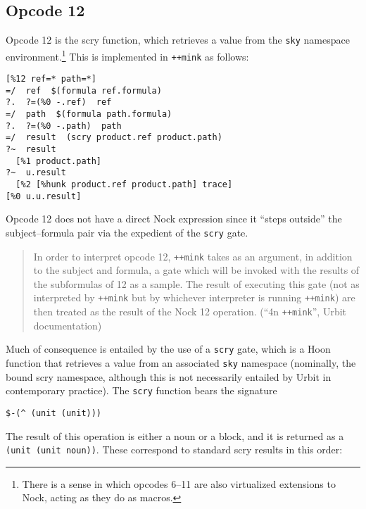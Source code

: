 \documentclass[twoside]{article}
\begin{document}
\subsection{Opcode 12}

Opcode 12 is the scry function, which retrieves a value from the \lstinline[style=inlinecode]{sky} namespace environment.\footnote{There is a sense in which opcodes 6--11 are also virtualized extensions to Nock, acting as they do as macros.}  This is implemented in \lstinline[style=inlinecode]{++mink} as follows:

\begin{lstlisting}[style=listingcode]
  [%12 ref=* path=*]
=/  ref  $(formula ref.formula)
?.  ?=(%0 -.ref)  ref
=/  path  $(formula path.formula)
?.  ?=(%0 -.path)  path
=/  result  (scry product.ref product.path)
?~  result
  [%1 product.path]
?~  u.result
  [%2 [%hunk product.ref product.path] trace]
[%0 u.u.result]
\end{lstlisting}

\noindent
Opcode 12 does not have a direct Nock expression since it ``steps outside'' the subject--formula pair via the expedient of the \lstinline[style=inlinecode]{scry} gate.

\begin{quote}
  In order to interpret opcode 12, \lstinline[style=inlinecode]{++mink} takes as an argument, in addition to the subject and formula, a gate which will be invoked with the results of the subformulas of 12 as a sample. The result of executing this gate (not as interpreted by \lstinline[style=inlinecode]{++mink} but by whichever interpreter is running \lstinline[style=inlinecode]{++mink}) are then treated as the result of the Nock 12 operation.  (``4n \texttt{++mink}'', Urbit documentation)
\end{quote}

\sloppy
Much of consequence is entailed by the use of a \lstinline[style=inlinecode]{scry} gate, which is a Hoon function that retrieves a value from an associated \lstinline[style=inlinecode]{sky} namespace (nominally, the bound scry namespace, although this is not necessarily entailed by Urbit in contemporary practice).  The \lstinline[style=inlinecode]{scry} function bears the signature
\begin{lstlisting}[style=listingblock]
$-(^ (unit (unit)))
\end{lstlisting}

\noindent
The result of this operation is either a noun or a block, and it is returned as a \lstinline[style=inlinecode]{(unit (unit noun))}.  These correspond to standard scry results in this order:
\end{document}
